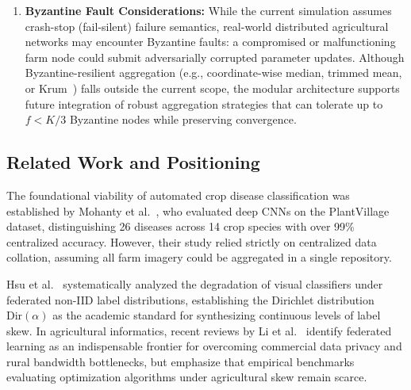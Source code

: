 \documentclass[applsci,article,submit,oneauthor,pdftex]{Definitions/mdpi}
\begin{document}
\begin{enumerate}[leftmargin=*]
    \item \textbf{Byzantine Fault Considerations:} While the current simulation assumes crash-stop (fail-silent) failure semantics, real-world distributed agricultural networks may encounter Byzantine faults: a compromised or malfunctioning farm node could submit adversarially corrupted parameter updates. Although Byzantine-resilient aggregation (e.g., coordinate-wise median, trimmed mean, or Krum~\cite{blanchard2017machine}) falls outside the current scope, the modular architecture supports future integration of robust aggregation strategies that can tolerate up to $f < K/3$ Byzantine nodes while preserving convergence.
\end{enumerate}

\subsection{Related Work and Positioning}
The foundational viability of automated crop disease classification was established by Mohanty et al.~\cite{mohanty2016using}, who evaluated deep CNNs on the PlantVillage dataset, distinguishing 26 diseases across 14 crop species with over 99\% centralized accuracy. However, their study relied strictly on centralized data collation, assuming all farm imagery could be aggregated in a single repository.

Hsu et al.~\cite{hsu2019measuring} systematically analyzed the degradation of visual classifiers under federated non-IID label distributions, establishing the Dirichlet distribution $\mathrm{Dir}(\alpha)$ as the academic standard for synthesizing continuous levels of label skew. In agricultural informatics, recent reviews by Li et al.~\cite{li2021federated_agri} identify federated learning as an indispensable frontier for overcoming commercial data privacy and rural bandwidth bottlenecks, but emphasize that empirical benchmarks evaluating optimization algorithms under agricultural skew remain scarce.
\end{document}
